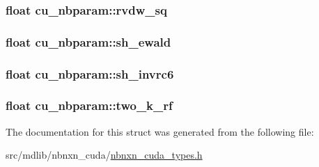 \hypertarget{structcu__nbparam_a9a9772cd434a3d84e00f113314e5c928}{
\subsubsection[{rvdw\-\_\-sq}]{\setlength{\rightskip}{0pt plus 5cm}float {\bf cu\-\_\-nbparam\-::rvdw\-\_\-sq}}}\label{structcu__nbparam_a9a9772cd434a3d84e00f113314e5c928}
\hypertarget{structcu__nbparam_a9aaab36ae7804c9a0f25e482a33559aa}{
\subsubsection[{sh\-\_\-ewald}]{\setlength{\rightskip}{0pt plus 5cm}float {\bf cu\-\_\-nbparam\-::sh\-\_\-ewald}}}\label{structcu__nbparam_a9aaab36ae7804c9a0f25e482a33559aa}
\hypertarget{structcu__nbparam_adddc8466ba4888883c609cccff3be2b6}{
\subsubsection[{sh\-\_\-invrc6}]{\setlength{\rightskip}{0pt plus 5cm}float {\bf cu\-\_\-nbparam\-::sh\-\_\-invrc6}}}\label{structcu__nbparam_adddc8466ba4888883c609cccff3be2b6}
\hypertarget{structcu__nbparam_af7604094cb717320f44ada3be4144fe9}{
\subsubsection[{two\-\_\-k\-\_\-rf}]{\setlength{\rightskip}{0pt plus 5cm}float {\bf cu\-\_\-nbparam\-::two\-\_\-k\-\_\-rf}}}\label{structcu__nbparam_af7604094cb717320f44ada3be4144fe9}


\-The documentation for this struct was generated from the following file\-:\begin{DoxyCompactItemize}
\item 
src/mdlib/nbnxn\-\_\-cuda/\hyperlink{nbnxn__cuda__types_8h}{nbnxn\-\_\-cuda\-\_\-types.\-h}\end{DoxyCompactItemize}
